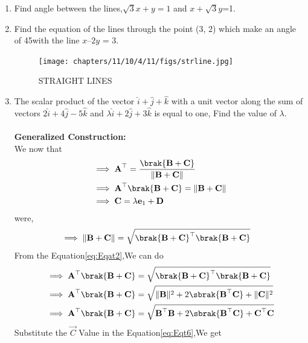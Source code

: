 \begin{enumerate}[label=\thesection.\arabic*,ref=\thesection.\theenumi]
\label{chapters/11/10/1/11}

\item    Find angle between the lines,$\sqrt{3}x+y=1$ and $x+\sqrt{3}y$=1.
\label{chapters/11/10/3/9}

\item Find the equation of the lines through the point (3, 2) which make an angle of 45\degree  with the line $x – 2y$ = 3.
\label{chapters/11/10/4/11}\\
\solution

\begin{figure}[H]
\centering
\texttt{[image: chapters/11/10/4/11/figs/strline.jpg]}
\caption{STRAIGHT LINES}
\label{fig:chapters/11/10/4/11/figs/strline.jpg}
\end{figure}
\item\textbf{}The scalar product of the vector $\hat{i}+\hat{j}+\hat{k}$ with a unit vector along the sum of vectors $2\hat{i}+4\hat{j}-5\hat{k}$ and $\lambda\hat{i}+2\hat{j}+3\hat{k}$ is equal to one, Find the value of $\lambda$.
\\\\
\textbf{Generalized Construction:}\\
We now that \\
\begin{align}
   &\implies \vec{A}^\top = \frac{\brak{\vec{B}+\vec{C}}}{\norm{\vec{B}+\vec{C}}}\\
       &\implies \vec{A}^\top \brak{\vec{B}+\vec{C}}=\norm{\vec{B}+\vec{C}} \label{eq:Eqat2}\\
       &\implies \vec{C}=\lambda\vec{e}_1+\vec{D}\label{eq:EQT-C}
    \end{align}
    were,
    \begin{align}
       &\implies \norm{\vec{B}+\vec{C}}= \sqrt{\brak{\vec{B}+\vec{C}}^\top\brak{\vec{B}+\vec{C}}}
    \end{align}
From the Equation\eqref{eq:Eqat2},We can do
\begin{align}
   &\implies \vec{A}^\top \brak{\vec{B}+\vec{C}}=\sqrt{\brak{\vec{B}+\vec{C}}^\top\brak{\vec{B}+\vec{C}}}\\
&\implies \vec{A}^\top \brak{\vec{B}+\vec{C}}=\sqrt{\norm{\vec{B}}^2+2\sbrak{\vec{B}^{\top}\vec{C}}+\norm{\vec{C}}^2}\\
&\implies \vec{A}^\top \brak{\vec{B}+\vec{C}}=\sqrt{{\vec{B}^{\top}\vec{B}}+2\sbrak{\vec{B}^{\top}\vec{C}}+{\vec{C}^\top\vec{C}}}\label{eq:Eqt6}
\end{align}
Substitute the $\vec{C}$ Value in the Equation\eqref{eq:Eqt6},We get
\begin{align}

\end{align}
\end{enumerate}
